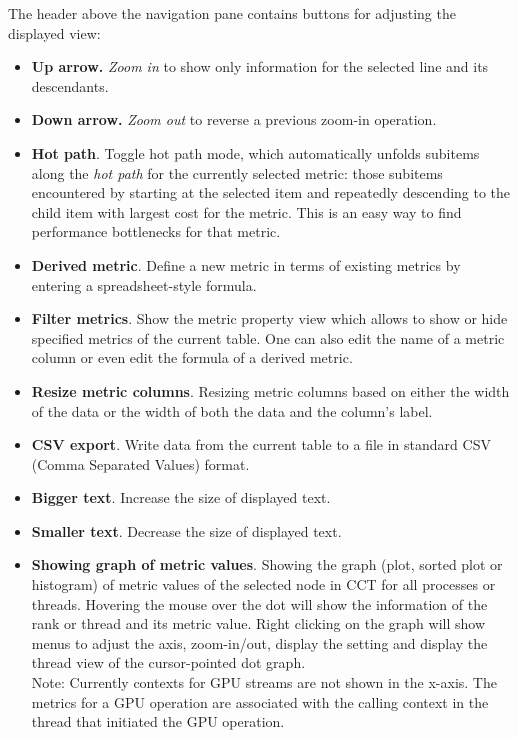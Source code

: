 \documentclass[english]{article}
\begin{document}
\begin{itemize}
The header above the navigation pane contains buttons for adjusting the displayed view:

\begin{itemize}

\item \textbf{Up arrow.} \emph{Zoom in} to show only information for the selected line and its descendants.

\item \textbf{Down arrow.} \emph{Zoom out} to reverse a previous zoom-in operation.

\item \textbf{Hot path}. Toggle hot path mode,
which automatically unfolds subitems along the \emph{hot path} for the currently selected metric:
those subitems encountered by starting at the selected item
and repeatedly descending to the child item with largest cost for the metric.
This is an easy way to find performance bottlenecks for that metric.

\item \textbf{Derived metric}. Define a new metric in terms of existing metrics
by entering a spreadsheet-style formula.

\item \textbf{Filter metrics}. Show the metric property view which allows to show or hide specified metrics of the current table.
One can also edit the name of a metric column or even edit the formula of a derived metric.

\item \textbf{Resize metric columns}. Resizing metric columns based on either the width of the data
        or the width of both the data and the column's label.

\item \textbf{CSV export}. Write data from the current table to a file
in standard CSV (Comma Separated Values) format.

\item \textbf{Bigger text}. Increase the size of displayed text.

\item \textbf{Smaller text}. Decrease the size of displayed text.

\item \textbf{Showing graph of metric values}.
Showing the graph (plot, sorted plot or histogram) of metric values of the selected node in CCT for all processes or threads.
Hovering the mouse over the dot will show the information of the rank or thread and its metric value.
Right clicking on the graph will show menus to adjust the axis, zoom-in/out, display the setting and display the thread view of the cursor-pointed dot graph.\\
Note: Currently contexts for GPU streams are not shown in the x-axis.
The metrics for a GPU operation are associated with the calling context in the thread that initiated the GPU operation.


\end{itemize}
\end{itemize}
\end{document}
